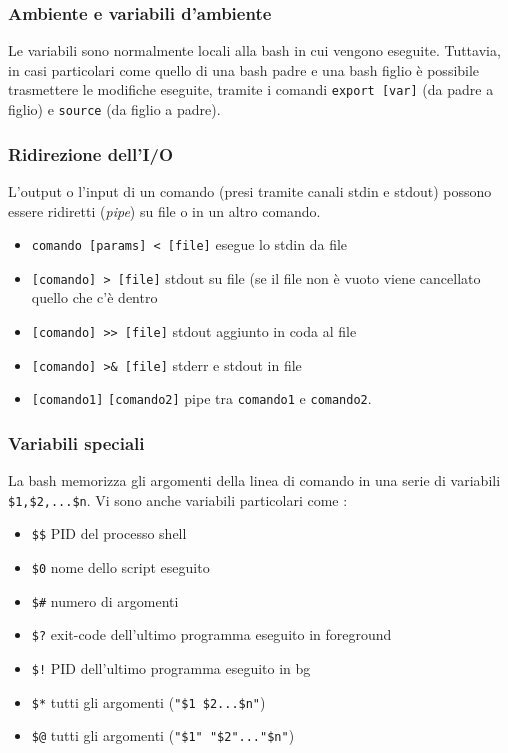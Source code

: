 \documentclass[a4paper, 10pt]{article}
\begin{document}
\subsubsection{Ambiente e variabili d'ambiente}
Le variabili sono normalmente locali alla bash in cui vengono eseguite. Tuttavia, in casi particolari come quello di una bash padre e una bash figlio è possibile trasmettere le modifiche eseguite, tramite i comandi \verb|export [var]| (da padre a figlio) e \verb|source| (da figlio a padre).

\subsubsection{Ridirezione dell'I/O}
L'output o l'input di un comando (presi tramite canali stdin e stdout) possono essere ridiretti (\textit{pipe}) su file o in un altro comando.
\begin{itemize}
\item \verb|comando [params] < [file]| esegue lo stdin da file
\item \verb|[comando] > [file]| stdout su file (se il file non è vuoto viene cancellato quello che c'è dentro
\item \verb|[comando] >> [file]| stdout aggiunto in coda al file
\item \verb|[comando] >& [file]| stderr e stdout in file
\item \verb|[comando1]| \textbar \verb|[comando2]| pipe tra \verb|comando1| e \verb|comando2|.
\end{itemize}

\subsubsection{Variabili speciali}
La bash memorizza gli argomenti della linea di comando in una serie di variabili \verb|$1,$2,...$n|. Vi sono anche variabili particolari come :
\begin{itemize}
\item \verb|$$| PID del processo shell
\item \verb|$0| nome dello script eseguito
\item \verb|$#| numero di argomenti
\item \verb|$?| exit-code dell'ultimo programma eseguito in foreground
\item \verb|$!| PID dell'ultimo programma eseguito in bg
\item \verb|$*| tutti gli argomenti (\verb|"$1 $2...$n"|)
\item \verb|$@| tutti gli argomenti (\verb|"$1" "$2"..."$n"|)
\end{itemize}
\end{document}
